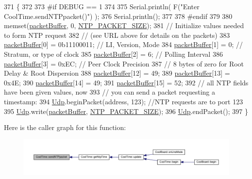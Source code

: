 \begin{DoxyCode}
371 \{
372 
373 \textcolor{preprocessor}{#if DEBUG == 1 }
374 
375     Serial.println( F(\textcolor{stringliteral}{"Enter CoolTime.sendNTPpacket()"}) );
376     Serial.println();
377 
378 \textcolor{preprocessor}{#endif}
379 
380     memset(\hyperlink{class_cool_time_a27e6abc82a5c2f72161956967005bec7}{packetBuffer}, 0, \hyperlink{_cool_time_8h_a56a6ea64006651b4f42adf713e244f06}{NTP\_PACKET\_SIZE});
381     \textcolor{comment}{// Initialize values needed to form NTP request}
382     \textcolor{comment}{// (see URL above for details on the packets)}
383     \hyperlink{class_cool_time_a27e6abc82a5c2f72161956967005bec7}{packetBuffer}[0] = 0b11100011;   \textcolor{comment}{// LI, Version, Mode}
384     \hyperlink{class_cool_time_a27e6abc82a5c2f72161956967005bec7}{packetBuffer}[1] = 0;     \textcolor{comment}{// Stratum, or type of clock}
385     \hyperlink{class_cool_time_a27e6abc82a5c2f72161956967005bec7}{packetBuffer}[2] = 6;     \textcolor{comment}{// Polling Interval}
386     \hyperlink{class_cool_time_a27e6abc82a5c2f72161956967005bec7}{packetBuffer}[3] = 0xEC;  \textcolor{comment}{// Peer Clock Precision}
387     \textcolor{comment}{// 8 bytes of zero for Root Delay & Root Dispersion}
388     \hyperlink{class_cool_time_a27e6abc82a5c2f72161956967005bec7}{packetBuffer}[12]  = 49;
389     \hyperlink{class_cool_time_a27e6abc82a5c2f72161956967005bec7}{packetBuffer}[13]  = 0x4E;
390     \hyperlink{class_cool_time_a27e6abc82a5c2f72161956967005bec7}{packetBuffer}[14]  = 49;
391     \hyperlink{class_cool_time_a27e6abc82a5c2f72161956967005bec7}{packetBuffer}[15]  = 52;
392     \textcolor{comment}{// all NTP fields have been given values, now}
393     \textcolor{comment}{// you can send a packet requesting a timestamp:                 }
394     \hyperlink{class_cool_time_a4e23216a8121ca79d0fb019f30884b92}{Udp}.beginPacket(address, 123); \textcolor{comment}{//NTP requests are to port 123}
395     \hyperlink{class_cool_time_a4e23216a8121ca79d0fb019f30884b92}{Udp}.write(\hyperlink{class_cool_time_a27e6abc82a5c2f72161956967005bec7}{packetBuffer}, \hyperlink{_cool_time_8h_a56a6ea64006651b4f42adf713e244f06}{NTP\_PACKET\_SIZE});
396     \hyperlink{class_cool_time_a4e23216a8121ca79d0fb019f30884b92}{Udp}.endPacket(); 
397 \}
\end{DoxyCode}
Here is the caller graph for this function\+:\nopagebreak
\begin{figure}[H]
\begin{center}
\leavevmode
\includegraphics[width=350pt]{d6/d49/class_cool_time_a236a38d120dc53bc67456d763838c5a1_icgraph}
\end{center}
\end{figure}
\mbox{\label{class_cool_time_ab81ea7fdaace111aa01cc1ec84c6d297}} 
